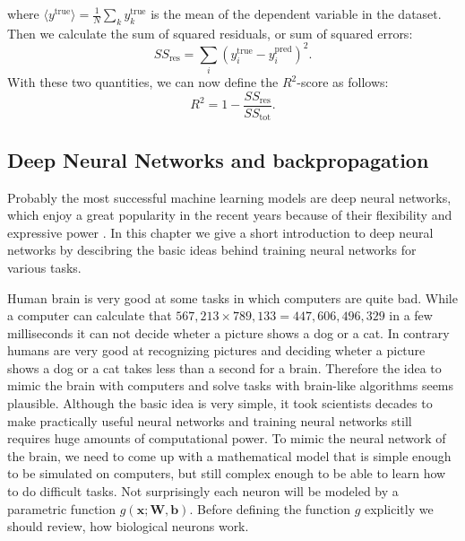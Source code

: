\documentclass[12pt, a4paper,  nobibnotes]{article}
\begin{document}
where $\langle y^{\textrm{true}} \rangle =\frac{1}{N} \sum\limits_{k}y_k^{\textrm{true}}$ is the
mean of the dependent variable in the dataset. Then we calculate the sum of squared residuals,
or sum of squared errors:
\begin{equation}
    SS_{\textrm{res}} = \sum\limits_{i}(y^{\textrm{true}}_i-y^{\textrm{pred}}_i)^2.
\end{equation}
With these two quantities, we can now define the $R^2$-score as follows:
\begin{equation}
    R^2 = 1-\frac{SS_{\textrm{res}}}{SS_{\textrm{tot}}}.
\end{equation}

\subsection{Deep Neural Networks and backpropagation}
\label{sec:dnn}
Probably the most successful machine learning models are deep neural networks, which enjoy a great 
popularity in the recent years because of their flexibility and expressive power \cite{LeCun2015DeepLearning}.
In this chapter we give a short introduction to deep neural networks by descibring the basic 
ideas behind training neural networks for various tasks.

Human brain is very good at some tasks in which computers are quite bad. While a computer 
can calculate that $567,213\times 789,133 = 447,606,496,329$ in a few milliseconds it can not decide 
wheter a picture shows a dog or a cat. In contrary humans are very good at recognizing pictures and 
deciding wheter a picture shows a dog or a cat takes less than a second for a brain.
Therefore the idea to mimic the brain with computers and solve tasks with brain-like algorithms 
seems plausible. Although the basic idea is very simple, it took scientists decades to make 
practically useful neural networks and training neural networks still requires huge amounts
of computational power.
To mimic the neural network of the brain, we need to come up with a mathematical model that is 
simple enough to be simulated on computers, but still complex enough to be able to learn how 
to do difficult tasks. Not surprisingly each neuron will be modeled by
a parametric function $g(\mathbf x;\mathbf W, \mathbf b)$. Before defining the function 
$g$ explicitly we should review, how biological neurons work. 
\end{document}

